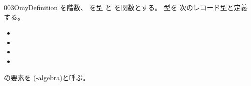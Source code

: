 \documentclass[index]{subfiles}
\begin{document}
\begin{myBlock}{003O}{myDefinition}
  を階数、
  を型
  と
  を関数とする。
  型を
  次のレコード型と定義する。
  \begin{itemize}
  \item {}
  \item {}
  \item {}
  \item {}
  \end{itemize}
  の要素を
  (-algebra)と呼ぶ。
\end{myBlock}
\end{document}
